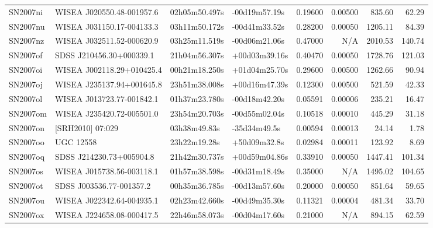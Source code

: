 \begin{longtable}{llllrrrr}
SN2007ni         &       WISEA J020550.48-001957.6 &   02h05m50.497s &   -00d19m57.19s &  0.19600 &  0.00500 &   835.60 &       62.29 \\
SN2007nu         &       WISEA J031150.17-004133.3 &   03h11m50.172s &   -00d41m33.52s &  0.28200 &  0.00050 &  1205.11 &       84.39 \\
SN2007nz         &       WISEA J032511.52-000620.9 &   03h25m11.519s &   -00d06m21.06s &  0.47000 &      N/A &  2010.53 &      140.74 \\
SN2007of         &        SDSS J210456.30+000339.1 &   21h04m56.307s &   +00d03m39.16s &  0.40470 &  0.00050 &  1728.76 &      121.03 \\
SN2007oi         &       WISEA J002118.29+010425.4 &   00h21m18.250s &   +01d04m25.70s &  0.29600 &  0.00500 &  1262.66 &       90.94 \\
SN2007oj         &       WISEA J235137.94+001645.8 &   23h51m38.008s &   +00d16m47.39s &  0.12300 &  0.00500 &   521.59 &       42.33 \\
SN2007ol         &       WISEA J013723.77-001842.1 &   01h37m23.780s &   -00d18m42.20s &  0.05591 &  0.00006 &   235.21 &       16.47 \\
SN2007om         &       WISEA J235420.72-005501.0 &   23h54m20.703s &   -00d55m02.04s &  0.10518 &  0.00010 &   445.29 &       31.18 \\
SN2007on         &                [SRH2010] 07:029 &    03h38m49.83s &    -35d34m49.5s &  0.00594 &  0.00013 &    24.14 &        1.78 \\
SN2007oo         &                       UGC 12558 &    23h22m19.28s &    +50d09m32.8s &  0.02984 &  0.00011 &   123.92 &        8.69 \\
SN2007oq         &        SDSS J214230.73+005904.8 &   21h42m30.737s &   +00d59m04.86s &  0.33910 &  0.00050 &  1447.41 &      101.34 \\
SN2007os         &       WISEA J015738.56-003118.1 &   01h57m38.598s &   -00d31m18.49s &  0.35000 &      N/A &  1495.02 &      104.65 \\
SN2007ot         &        SDSS J003536.77-001357.2 &   00h35m36.785s &   -00d13m57.60s &  0.20000 &  0.00050 &   851.64 &       59.65 \\
SN2007ou         &       WISEA J022342.64-004935.1 &   02h23m42.660s &   -00d49m35.30s &  0.11321 &  0.00004 &   481.34 &       33.70 \\
SN2007ox         &       WISEA J224658.08-000417.5 &   22h46m58.073s &   -00d04m17.60s &  0.21000 &      N/A &   894.15 &       62.59 \\

\end{longtable}

